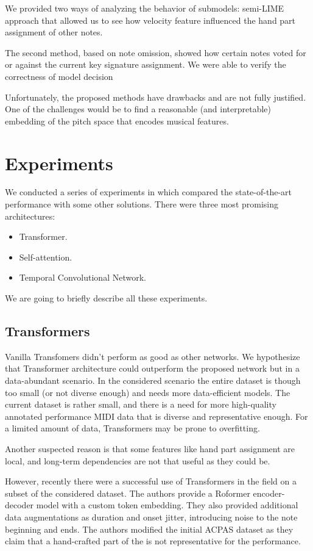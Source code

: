 We provided two ways of analyzing the behavior of submodels: semi-LIME approach that allowed us to see how velocity feature influenced the hand part assignment of other notes.

The second method, based on note omission, showed how certain notes voted for or against the current key signature assignment. We were able to verify the correctness of model decision 

Unfortunately, the proposed methods have drawbacks and are not fully justified. One of the challenges would be to find a reasonable (and interpretable) embedding of the pitch space that encodes musical features. 

\section{Experiments}

We conducted a series of experiments in which compared the state-of-the-art performance with some other solutions. There were three most promising architectures: \begin{itemize}
	\item Transformer.
	\item Self-attention.
	\item Temporal Convolutional Network.
\end{itemize}

We are going to briefly describe all these experiments.

\subsection{Transformers}

Vanilla Transfomers didn't perform as good as other networks. We hypothesize that Transformer architecture could outperform the proposed network but in a data-abundant scenario. In the considered scenario the entire dataset is though too small (or not diverse enough) and needs more data-efficient models. The current dataset is rather small, and there is a need for more high-quality annotated performance MIDI data that is diverse and representative enough. For a limited amount of data, Transformers may be prone to overfitting.

Another suspected reason is that some features like hand part assignment are local, and long-term dependencies are not that useful as they could be. 

However, recently there were a successful use of Transformers in the field \cite{Beyer2024} on a subset of the considered dataset. The authors provide a Roformer encoder-decoder model with a custom token embedding. They also provided additional data augmentations as duration and onset jitter, introducing noise to the note beginning and ends. The authors modified the initial ACPAS dataset as they claim that a hand-crafted part of the is not representative for the performance. 

